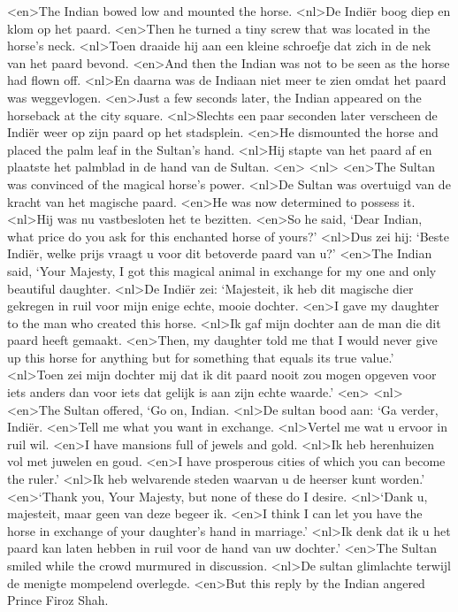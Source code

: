 <en>The Indian bowed low and mounted the horse.
<nl>De Indi\"er boog diep en klom op het paard.
<en>Then he turned a tiny screw that was located in the horse's neck.
<nl>Toen draaide hij aan een kleine schroefje dat zich in de nek van het paard bevond.
<en>And then the Indian was not to be seen as the horse had flown off.
<nl>En daarna was de Indiaan niet meer te zien omdat het paard was weggevlogen.
<en>Just a few seconds later, the Indian appeared on the horseback at the city square.
<nl>Slechts een paar seconden later verscheen de Indi\"er weer op zijn  paard op het stadsplein.
<en>He dismounted the horse and placed the palm leaf in the Sultan's hand.
<nl>Hij stapte van het paard af en plaatste het palmblad in de hand van de Sultan.
<en>
<nl>
<en>The Sultan was convinced of the magical horse's power.
<nl>De Sultan was overtuigd van de kracht van het magische paard.
<en>He was now determined to possess it.
<nl>Hij was nu vastbesloten het te bezitten.
<en>So he said, `Dear Indian, what price do you ask for this enchanted horse of yours?'
<nl>Dus zei hij: `Beste Indi\"er, welke prijs vraagt u voor dit betoverde paard van u?'
<en>The Indian said, `Your Majesty, I got this magical animal in exchange for my one and only beautiful daughter.
<nl>De Indi\"er zei: `Majesteit, ik heb dit magische dier gekregen  in ruil voor mijn enige echte,  mooie dochter.
<en>I gave my daughter to the man who created this horse.
<nl>Ik gaf mijn dochter aan de man die dit paard heeft gemaakt.
<en>Then, my daughter told me that I would never give up this horse for anything but for something that equals its true value.'
<nl>Toen zei mijn dochter mij dat ik dit paard nooit zou mogen opgeven voor iets anders dan voor iets dat gelijk is aan zijn echte waarde.'
<en>
<nl>
<en>The Sultan offered, `Go on, Indian.
<nl>De sultan bood aan: `Ga verder, Indi\"er.
<en>Tell me what you want in exchange.
<nl>Vertel me wat u ervoor in ruil wil.
<en>I have mansions full of jewels and gold.
<nl>Ik heb herenhuizen vol met juwelen en goud.
<en>I have prosperous cities of which you can become the ruler.'
<nl>Ik heb welvarende steden waarvan u de heerser kunt worden.'
<en>`Thank you, Your Majesty, but none of these do I desire.
<nl>`Dank u, majesteit, maar geen van deze begeer ik.
<en>I think I can let you have the horse in exchange of your daughter's hand in marriage.'
<nl>Ik denk dat ik u het paard kan laten hebben in ruil voor de hand van uw dochter.'
<en>The Sultan smiled while the crowd murmured in discussion.
<nl>De sultan glimlachte terwijl de menigte  mompelend overlegde.
<en>But this reply by the Indian angered Prince Firoz Shah.
